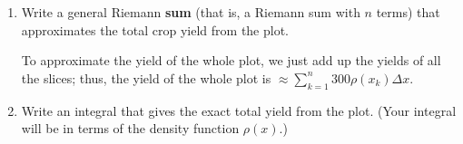 \documentclass{article}
\begin{document}
\begin{enumerate}
\begin{enumerate}
    \begin{solution}
      We're focusing on the $k$-th slice:
      \begin{center}        
      \end{center}
      The crop yield in this slice can be approximated as
      \begin{align*}
        \text{yield of $k$-th slice} & \approx (\text{yield density in
          $k$-th slice}) \cdot (\text{area of $k$-th slice}) \\
        \intertext{The slice is a rectangle of width $\Delta x$ and height
          $300$, so}
        & \approx \boxed{\rho(x_k) \cdot 300 \Delta x}
      \end{align*}
    \end{solution}

  \item
    \begin{problem}[\vfill]
      Write a general Riemann \textbf{sum} (that is, a Riemann sum with
      $n$ terms) that approximates the total crop yield from the plot.
    \end{problem}

    \begin{solution}
      To approximate the yield of the whole plot, we just add up the
      yields of all the slices; thus, the yield of the whole plot is 
      $\approx \boxed{\sum_{k=1}^n 300 \rho(x_k) \Delta x}$. 
    \end{solution}

  \item
    \begin{problem}[\vfill]
      Write an integral that gives the exact total yield from the plot.
      (Your integral will be in terms of the density function $\rho(x)$.) 
    \end{problem}


\end{enumerate}
\end{enumerate}
\end{document}
